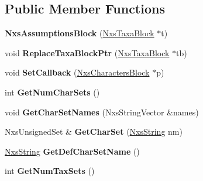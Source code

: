 \subsection*{Public Member Functions}
\begin{DoxyCompactItemize}
\item 
\hypertarget{classNxsAssumptionsBlock_a1c91eb5774685b8876250056f08bf3a2}{
{\bfseries NxsAssumptionsBlock} (\hyperlink{classNxsTaxaBlock}{NxsTaxaBlock} $\ast$t)}
\label{classNxsAssumptionsBlock_a1c91eb5774685b8876250056f08bf3a2}

\item 
\hypertarget{classNxsAssumptionsBlock_a18237c0576ffeee41fca0deabc73a743}{
void {\bfseries ReplaceTaxaBlockPtr} (\hyperlink{classNxsTaxaBlock}{NxsTaxaBlock} $\ast$tb)}
\label{classNxsAssumptionsBlock_a18237c0576ffeee41fca0deabc73a743}

\item 
\hypertarget{classNxsAssumptionsBlock_a7eb13fdafe622c0a114bc9f4d9426ea3}{
void {\bfseries SetCallback} (\hyperlink{classNxsCharactersBlock}{NxsCharactersBlock} $\ast$p)}
\label{classNxsAssumptionsBlock_a7eb13fdafe622c0a114bc9f4d9426ea3}

\item 
\hypertarget{classNxsAssumptionsBlock_a65424f0588dc3d77834f6b3f1bc61867}{
int {\bfseries GetNumCharSets} ()}
\label{classNxsAssumptionsBlock_a65424f0588dc3d77834f6b3f1bc61867}

\item 
\hypertarget{classNxsAssumptionsBlock_a4dc4bd89b848a1ffc86b054cc7d6601c}{
void {\bfseries GetCharSetNames} (NxsStringVector \&names)}
\label{classNxsAssumptionsBlock_a4dc4bd89b848a1ffc86b054cc7d6601c}

\item 
\hypertarget{classNxsAssumptionsBlock_abefd0efc65f9cddf675166060df1ccce}{
NxsUnsignedSet \& {\bfseries GetCharSet} (\hyperlink{classNxsString}{NxsString} nm)}
\label{classNxsAssumptionsBlock_abefd0efc65f9cddf675166060df1ccce}

\item 
\hypertarget{classNxsAssumptionsBlock_a7336b168163deaf0fd20cb918498785c}{
\hyperlink{classNxsString}{NxsString} {\bfseries GetDefCharSetName} ()}
\label{classNxsAssumptionsBlock_a7336b168163deaf0fd20cb918498785c}

\item 
\hypertarget{classNxsAssumptionsBlock_aead6a4a2ddb3894003d32af95a45465b}{
int {\bfseries GetNumTaxSets} ()}
\label{classNxsAssumptionsBlock_aead6a4a2ddb3894003d32af95a45465b}


\end{DoxyCompactItemize}
